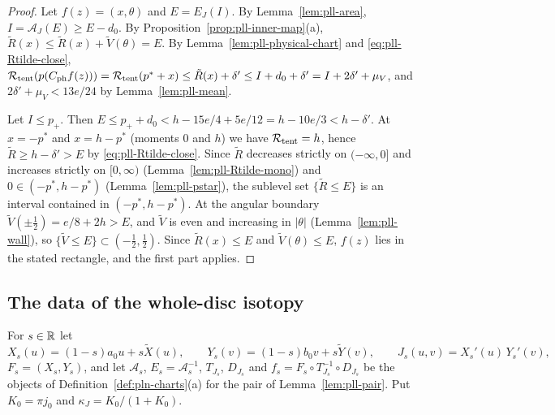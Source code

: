 \begin{proof}
Let $f(z)=(x,\theta)$ and $E=E_J(I)$. By Lemma~\ref{lem:pll-area}, $I=\mathcal A_J(E)\ge E-d_0$. By
Proposition~\ref{prop:pll-inner-map}(a), $\tilde R(x)\le\tilde R(x)+\tilde V(\theta)=E$. By
Lemma~\ref{lem:pll-physical-chart} and \eqref{eq:pll-Rtilde-close},
$\mathcal{R}_{\rm tent}(p(C_{\rm ph}f(z)))=\mathcal{R}_{\rm tent}(p^*+x)\le\tilde R(x)+\delta'\le I+d_0+\delta'=I+2\delta'+\mu_V$,
and $2\delta'+\mu_V<13e/24$ by Lemma~\ref{lem:pll-mean}.

Let $I\le p_+$. Then $E\le p_++d_0<h-15e/4+5e/12=h-10e/3<h-\delta'$. At $x=-p^*$ and $x=h-p^*$ (moments $0$ and
$h$) we have $\mathcal{R}_{\rm tent}=h$, hence $\tilde R\ge h-\delta'>E$ by \eqref{eq:pll-Rtilde-close}. Since $\tilde R$
decreases strictly on $(-\infty,0]$ and increases strictly on $[0,\infty)$ (Lemma~\ref{lem:pll-Rtilde-mono}) and
$0\in(-p^*,h-p^*)$ (Lemma~\ref{lem:pll-pstar}), the sublevel set $\{\tilde R\le E\}$ is an interval contained in
$(-p^*,h-p^*)$. At the angular boundary $\tilde V(\pm\frac12)=e/8+2h>E$, and $\tilde V$ is even and increasing in
$|\theta|$ (Lemma~\ref{lem:pll-wall}), so $\{\tilde V\le E\}\subset(-\frac12,\frac12)$. Since $\tilde R(x)\le E$ and
$\tilde V(\theta)\le E$, $f(z)$ lies in the stated rectangle, and the first part applies.
\end{proof}

\subsection{The data of the whole-disc isotopy}\label{sec:pll-data}

\begin{definition}\label{def:pll-density}
For $s\in\mathbb{R}$ let
\[
 X_s(u)=(1-s)a_0u+s\tilde X(u),\qquad Y_s(v)=(1-s)b_0v+s\tilde Y(v),\qquad J_s(u,v)=X_s'(u)\,Y_s'(v),
\]
$F_s=(X_s,Y_s)$, and let $\mathcal A_s$, $E_s=\mathcal A_s^{-1}$, $T_{J_s}$, $D_{J_s}$ and
$f_s=F_s\circ T_{J_s}^{-1}\circ D_{J_s}$ be the objects of Definition~\ref{def:pln-charts}(a) for the pair of
Lemma~\ref{lem:pll-pair}. Put $K_0=\pi j_0$ and $\kappa_J=K_0/(1+K_0)$.
\end{definition}

